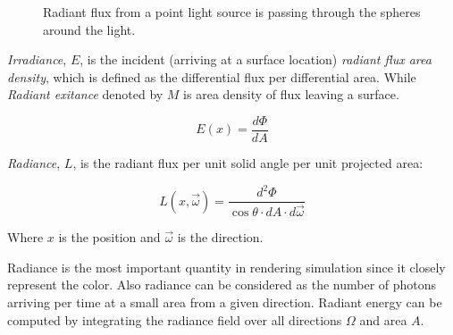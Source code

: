 \begin{figure}[htp] 
    \centering 
    \renewcommand{\thefigure}{\thechapter.\arabic{figure}}
    \caption[Radiant flux of point light source]{Radiant flux from a point light source is passing through the spheres around the light.}
    \label{fig:flux_point_light} 
\end{figure} 

\emph{Irradiance}, \(E\), is the incident (arriving at a surface location) \emph{radiant flux area density}, which is defined as the differential flux per differential area. While \emph{Radiant exitance} denoted by \(M\) is area density of flux leaving a surface.  

\begin{equation}
E(x) = \frac{d\Phi}{dA}
\end{equation}

\emph{Radiance}, \(L\), is the radiant flux per unit solid angle per unit projected area: 

\begin{equation}
L(x, \overrightarrow{\omega}) = \frac{d^{2}\Phi}{\cos{\theta} \cdot dA \cdot d\overrightarrow{\omega}}
\end{equation}

Where \(x\) is the position and \(\overrightarrow{\omega}\) is the direction. 

Radiance is the most important quantity in rendering simulation since it closely represent the color. Also radiance can be considered as the number of photons arriving per time at a small area from a given direction. Radiant energy can be computed by integrating the radiance field over all directions \(\Omega\) and area \(A\).

